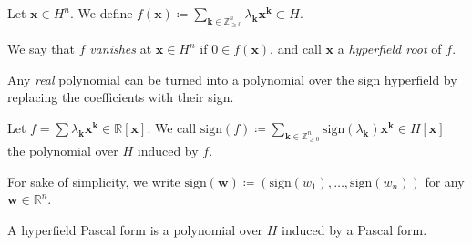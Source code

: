 \begin{definition}
    Let \( \mathbf{x} \in H^n \). We define \( f(\mathbf{x}) \coloneqq \sum_{\mathbf{k} \in \mathbb{Z}^n_{\geq 0}} \lambda_{\mathbf{k}} \mathbf{x}^{\mathbf{k}} \subset H \).
\end{definition}

\begin{definition}
    We say that \( f \) \emph{vanishes} at \( \mathbf{x} \in H^n \) if \( 0 \in f(\mathbf{x}) \), and call \( \mathbf{x} \) a \emph{hyperfield root} of \( f \).
\end{definition}


Any \emph{real} polynomial can be turned into a polynomial over the sign hyperfield by replacing the coefficients with their sign.

\begin{definition}
    Let \( f = \sum \lambda_{\mathbf{k}} \mathbf{x}^{\mathbf{k}} \in \mathbb{R}[\mathbf{x}] \). We call \( \mathrm{sign}(f) \coloneqq \sum_{\mathbf{k} \in \mathbb{Z}^n_{\geq 0}} \mathrm{sign}(\lambda_{\mathbf{k}}) \mathbf{x}^{\mathbf{k}} \in H[\mathbf{x}] \)
    the polynomial over \( H \) induced by \( f \).
\end{definition}

For sake of simplicity, we write \(  \mathrm{sign}(\mathbf{w}) \coloneqq (\mathrm{sign}(w_1), \dots, \mathrm{sign}(w_n)) \) for any \( \mathbf{w} \in \mathbb{R}^n \).

\begin{definition}
    A hyperfield Pascal form is a polynomial over \( H \) induced by a Pascal form.
\end{definition}


